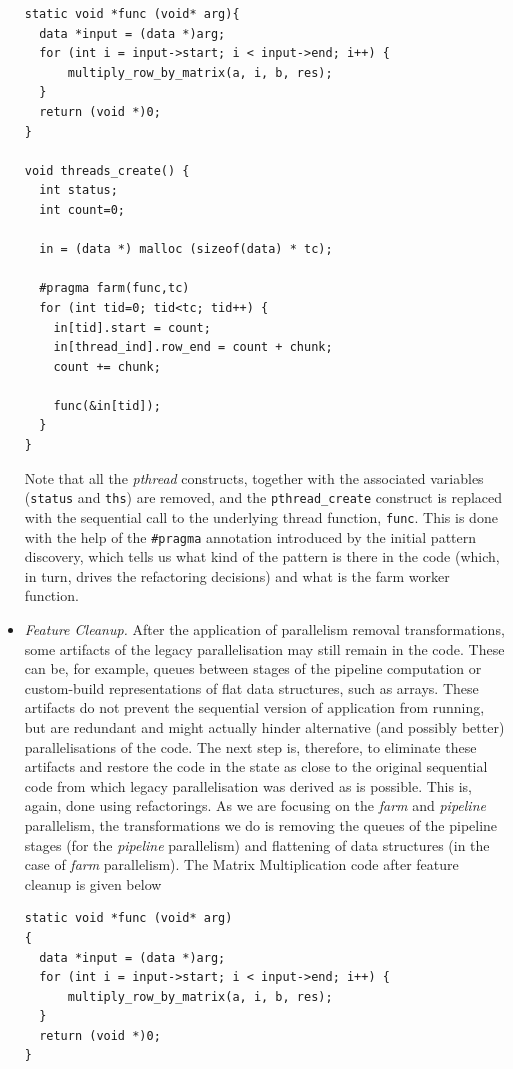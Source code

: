 \begin{itemize}
\begin{lstlisting}
static void *func (void* arg){
  data *input = (data *)arg;
  for (int i = input->start; i < input->end; i++) {
	  multiply_row_by_matrix(a, i, b, res);
  }
  return (void *)0;
}

void threads_create() {
  int status;
  int count=0;
    
  in = (data *) malloc (sizeof(data) * tc);

  #pragma farm(func,tc)   
  for (int tid=0; tid<tc; tid++) {  
    in[tid].start = count;
    in[thread_ind].row_end = count + chunk;
    count += chunk;

    func(&in[tid]);
  }
}
\end{lstlisting}

Note that all the \emph{pthread} constructs, together with the associated variables (\lstinline{status} and \lstinline{ths}) are removed, and the \lstinline{pthread_create} construct is replaced with the sequential call to the underlying thread function, \lstinline{func}. This is done with the help of the \lstinline{#pragma} annotation introduced by the initial pattern discovery, which tells us what kind of the pattern is there in the code (which, in turn, drives the refactoring decisions) and what is the farm worker function.

\item \emph{Feature Cleanup.} After the application of parallelism removal transformations, some artifacts of the legacy parallelisation may still remain in the code. These can be, for example, queues between stages of the pipeline computation or custom-build representations of flat data structures, such as arrays. These artifacts do not prevent the sequential version of application from running, but are redundant and might actually hinder alternative (and possibly better) parallelisations of the code. The next step is, therefore, to eliminate these artifacts and restore the code in the state as close to the original sequential code from which legacy parallelisation was derived as is possible. This is, again, done using refactorings. As we are focusing on the \emph{farm} and \emph{pipeline} parallelism, the transformations we do is removing the queues of the pipeline stages (for the \emph{pipeline} parallelism) and flattening of data structures (in the case of \emph{farm} parallelism). The Matrix Multiplication code after feature cleanup is given below

\begin{lstlisting}
static void *func (void* arg)
{
  data *input = (data *)arg;
  for (int i = input->start; i < input->end; i++) {
	  multiply_row_by_matrix(a, i, b, res);
  }
  return (void *)0;
}



\end{lstlisting}
\end{itemize}
